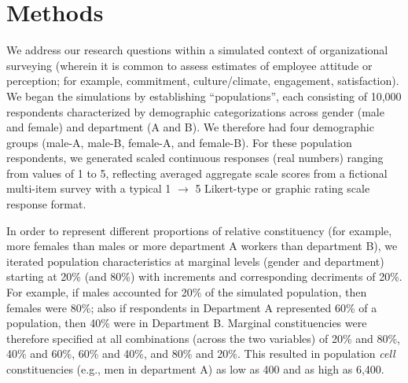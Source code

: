 \documentclass[
  man,mask]{apa7}
\begin{document}
\hypertarget{methods}{%
\section{Methods}\label{methods}}

We address our research questions within a simulated context of organizational surveying (wherein it is common to assess estimates of employee attitude or perception; for example, commitment, culture/climate, engagement, satisfaction). We began the simulations by establishing ``populations'', each consisting of 10,000 respondents characterized by demographic categorizations across gender (male and female) and department (A and B). We therefore had four demographic groups (male-A, male-B, female-A, and female-B). For these population respondents, we generated scaled continuous responses (real numbers) ranging from values of 1 to 5, reflecting averaged aggregate scale scores from a fictional multi-item survey with a typical 1 \(\rightarrow\) 5 Likert-type or graphic rating scale response format.

In order to represent different proportions of relative constituency (for example, more females than males or more department A workers than department B), we iterated population characteristics at marginal levels (gender and department) starting at 20\% (and 80\%) with increments and corresponding decriments of 20\%. For example, if males accounted for 20\% of the simulated population, then females were 80\%; also if respondents in Department A represented 60\% of a population, then 40\% were in Department B. Marginal constituencies were therefore specified at all combinations (across the two variables) of 20\% and 80\%, 40\% and 60\%, 60\% and 40\%, and 80\% and 20\%. This resulted in population \emph{cell} constituencies (e.g., men in department A) as low as 400 and as high as 6,400.
\end{document}
